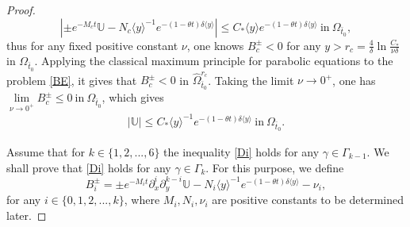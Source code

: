 \documentclass{amsart}
\numberwithin{equation}{section}
\newcommand\y{{{\langle y \rangle}}}
\begin{document}
\begin{proof}
$$|\pm e^{-M_{c}t}\mathbb{U}-N_{c}\y^{-1}e^{-(1-\theta t)\delta\y}|\leq C_{*}\y e^{-(1-\theta t)\delta\y}~\text{in}~\Omega_{\bar{t}_{0}},$$
thus for any fixed positive constant $\nu$, one knows $B_{c}^{\pm}<0$ for any $y>r_{c}=\frac{4}{\delta}\ln{\frac{C_{*}}{\nu\delta}}$ in $\Omega_{\bar{t}_{0}}$.
Applying the classical maximum principle for parabolic equations to the problem \eqref{BE}, it gives that
$B_{c}^{\pm}<0$ in $\hat{\Omega}_{\bar{t}_{0}}^{r_{c}}$.
Taking the limit $\nu\to 0^{+}$, one has $\lim\limits_{\nu\to 0^{+}}B_{c}^{\pm}\leq0 ~\text{in}~\Omega_{\bar{t}_{0}}$, which gives
\begin{align*}
|\mathbb{U}|\leq C_{*}\y^{-1}e^{-(1-\theta t)\delta\y} ~\text{in}~\Omega_{\bar{t}_{0}}.
\end{align*}

Assume that for $k\in\{1,2,...,6\}$ the inequality \eqref{Di} holds for any $\gamma\in\Gamma_{k-1}$. We shall prove that \eqref{Di} holds for any $\gamma\in\Gamma_{k}$. For this purpose, we define
$$B_{i}^{\pm}=\pm e^{-M_{i}t}\partial_{x}^{i}\partial_{y}^{k-i}\mathbb{U}-N_{i}\y^{-1}e^{-(1-\theta t)\delta\y}-\nu_{i},$$
for any $i\in\{0,1,2,...,k\}$, where $M_{i},N_{i},\nu_{i}$ are positive constants to be determined later.


\end{proof}
\end{document}
